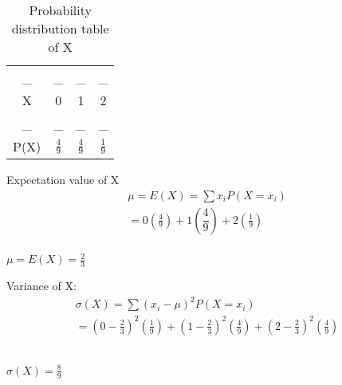 \documentclass[journal,12pt,twocolumn]{IEEEtran}
\begin{document}
\begin{center}
\begin{table}[h]
    \centering
    \begin{tabular}{||c|c|c|c||}
    \hline
    _ & _ & _& _\\
    X    & 0   & 1   & 2   \\[10pt]
    \hline
    _ & _ & _& _\\
    P(X) & {\Large$\frac{4}{9}$} & {\Large$\frac{4}{9}$} &  {\Large$\frac{1}{9}$}\\[10pt]
    \hline
    \end{tabular}
    \caption{Probability distribution table of X}
    \label{tab:my_label}
\end{table}
\end{center}
Expectation value of X
\begin{align}
    \mu = E(X) = \sum x_i P(X = x_i)\\
     = 0 \left(\frac{4}{9}\right) + 1 \left(\dfrac{4}{9}\right) + 2 \left(\frac{1}{9}\right)\\
\end{align}
\begin{center}
    {\Large $\mu = E(X) = \frac{2}{3}$}
\end{center}
Variance of X:
\begin{align}
    \sigma(X) = \sum (x_i - \mu)^2P(X = x_i)\\[15pt]
              =  \left(0 - \frac{2}{3} \right)^2 \left(\frac{1}{9} \right) + \left(1 - \frac{2}{3} \right)^2 \left(\frac{4}{9} \right) + \left(2 - \frac{2}{3} \right)^2 \left(\frac{4}{9} \right)
\end{align}\\
\begin{center}
  {\Large $\sigma(X) = \frac{8}{9}$}
\end{center}
\end{document}

